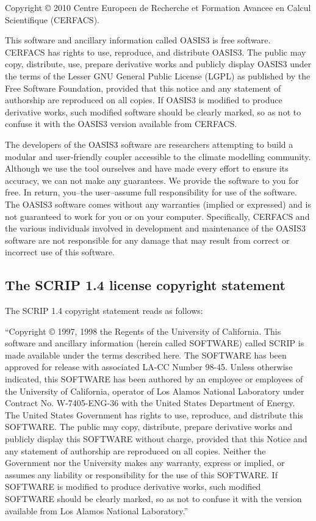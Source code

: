 Copyright © 2010 Centre Europeen de Recherche et Formation
Avancee en Calcul Scientifique (CERFACS).  

This software and ancillary information called OASIS3 is free
software.  CERFACS has rights to use, reproduce, and distribute
OASIS3. The public may copy, distribute, use, prepare derivative works and
publicly display OASIS3 under the terms of the Lesser GNU General
Public License (LGPL) as published by the Free Software Foundation,
provided that this notice and any statement of authorship are
reproduced on all copies. If OASIS3 is modified to produce derivative
works, such modified software should be clearly marked, so as not to
confuse it with the OASIS3 version available from CERFACS.

The developers of the OASIS3 software are researchers attempting to
build a modular and user-friendly coupler accessible to the climate
modelling community. Although we use the tool ourselves and have made
every effort to ensure its accuracy, we can not make any
guarantees. We provide the software to you for free. In return,
you--the user--assume full responsibility for use of the software. The
OASIS3 software comes without any warranties (implied or expressed) and
is not guaranteed to work for you or on your computer. Specifically,
CERFACS and the various individuals involved in development and
maintenance of the OASIS3 software are not responsible for any damage
that may result from correct or incorrect use of this software.

\subsection{The SCRIP 1.4 license copyright statement}
\label{sec_SCRIP}

The SCRIP 1.4 copyright statement reads as follows:

 ``Copyright © 1997, 1998 the Regents of the
University of California.  This software and ancillary information
(herein called SOFTWARE) called SCRIP is made available under the
terms described here. The SOFTWARE has been approved for release with
associated LA-CC Number 98-45. Unless otherwise indicated, this
SOFTWARE has been authored by an employee or employees of the
University of California, operator of Los Alamos National Laboratory
under Contract No. W-7405-ENG-36 with the United States Department of
Energy. The United States Government has rights to use, reproduce, and
distribute this SOFTWARE. The public may copy, distribute, prepare
derivative works and publicly display this SOFTWARE without charge,
provided that this Notice and any statement of authorship are
reproduced on all copies. Neither the Government nor the University
makes any warranty, express or implied, or assumes any liability or
responsibility for the use of this SOFTWARE. If SOFTWARE is modified
to produce derivative works, such modified SOFTWARE should be clearly
marked, so as not to confuse it with the version available from Los
Alamos National Laboratory.''

